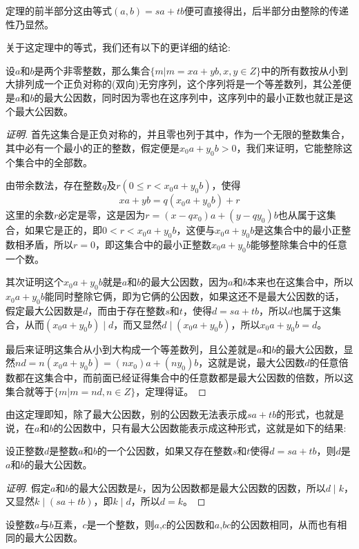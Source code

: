 定理的前半部分这由等式$(a,b)=sa+tb$便可直接得出，后半部分由整除的传递性乃显然。


关于这定理中的等式，我们还有以下的更详细的结论:
\begin{theorem}
  设$a$和$b$是两个非零整数，那么集合$\{m|m=xa+yb, x,y \in Z \}$中的所有数按从小到大排列成一个正负对称的(双向)无穷序列，这个序列将是一个等差数列，其公差便是$a$和$b$的最大公因数，同时因为零也在这序列中，这序列中的最小正数也就正是这个最大公因数。
\end{theorem}

\begin{proof}[证明]
  首先这集合是正负对称的，并且零也列于其中，作为一个无限的整数集合，其中必有一个最小的正的整数，假定便是$x_0a+y_0b>0$，我们来证明，它能整除这个集合中的全部数。

  由带余数法，存在整数$q$及$r(0 \leqslant r < x_0a+y_0b)$，使得
  \[ xa+yb = q(x_0a+y_0b) + r \]
  这里的余数$r$必定是零，这是因为$r=(x-qx_0)a+(y-qy_0)b$也从属于这集合，如果它是正的，即$0 < r < x_0a+y_0b$，这便与$x_0a+y_0b$是这集合中的最小正整数相矛盾，所以$r=0$，即这集合中的最小正整数$x_0a+y_0b$能够整除集合中的任意一个数。

  其次证明这个$x_0a+y_0b$就是$a$和$b$的最大公因数，因为$a$和$b$本来也在这集合中，所以$x_0a+y_0b$能同时整除它俩，即为它俩的公因数，如果这还不是最大公因数的话，假定最大公因数是$d$，而由于存在整数$s$和$t$，使得$d=sa+tb$，所以$d$也属于这集合，从而$(x_0a+y_0b) \mid d$，而又显然$d \mid (x_0a+y_0b)$，所以$x_0a+y_0b=d$。

  最后来证明这集合从小到大构成一个等差数列，且公差就是$a$和$b$的最大公因数，显然$nd=n(x_0a+y_0b)=(nx_0)a+(ny_0)b$，这就是说，最大公因数$d$的任意倍数都在这集合中，而前面已经证得集合中的任意数都是最大公因数的倍数，所以这集合就等于$\{m | m=nd, n\in Z \}$，定理得证。
\end{proof}

由这定理即知，除了最大公因数，别的公因数无法表示成$sa+tb$的形式，也就是说，在$a$和$b$的公因数中，只有最大公因数能表示成这种形式，这就是如下的结果:
\begin{theorem}
  设正整数$d$是整数$a$和$b$的一个公因数，如果又存在整数$s$和$t$使得$d=sa+tb$，则$d$是$a$和$b$的最大公因数。
\end{theorem}

\begin{proof}[证明]
  假定$a$和$b$的最大公因数是$k$，因为公因数都是最大公因数的因数，所以$d \mid k$，又显然$k \mid (sa+tb)$，即$k \mid d$，所以$d=k$。
\end{proof}

\begin{theorem}
  \label{theorem:a-prime-b--a-c--a--bc}
  设整数$a$与$b$互素，$c$是一个整数，则$a$,$c$的公因数和$a$,$bc$的公因数相同，从而也有相同的最大公因数。
\end{theorem}

